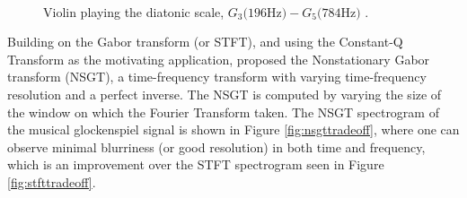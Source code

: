 \documentclass[report.tex]{subfiles}
\begin{document}
\begin{figure}[ht]
	\centering
	\\
	\caption{Violin playing the diatonic scale, $G_{3} \text{(196Hz)} - G_{5} \text{(784Hz)}$ \parencite[430]{jbrown}.}
	\label{fig:violin}
\end{figure}

Building on the Gabor transform (or STFT), and using the Constant-Q Transform as the motivating application, \textcite{balazs} proposed the Nonstationary Gabor transform (NSGT), a time-frequency transform with varying time-frequency resolution and a perfect inverse. The NSGT is computed by varying the size of the window on which the Fourier Transform taken. The NSGT spectrogram of the musical glockenspiel signal is shown in Figure \ref{fig:nsgttradeoff}, where one can observe minimal blurriness (or good resolution) in both time and frequency, which is an improvement over the STFT spectrogram seen in Figure \ref{fig:stfttradeoff}.
\end{document}
